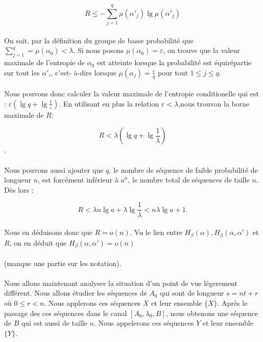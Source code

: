 	\[R \le -\sum_{j=1}^q\mu(\alpha'_j)\lg\mu(\alpha'_j)\]
	
	\paragraph{}
	On sait, par la définition du groupe de basse probabilité que $\sum_{j=1}^q =\mu(\alpha_0) < \lambda$. Si nous posons $\mu(\alpha_0)=\varepsilon$,
	on trouve que la valeur maximale de l'entropie de $\alpha_0$ est atteinte lorsque la probabilité est équirépartie sur tout les $\alpha'_i$, c'est-
	à-dire lorsque $\mu(\alpha_j)=\frac{\varepsilon}{q}$ pour tout $1\le j\le q$.
	
	\paragraph{}
	Nous pouvons donc calculer la valeur maximale de l'entropie conditionelle qui est : $\varepsilon \left(\lg q+\lg\frac{1}{\varepsilon}\right)$.
	En utilisant en plus la relation $\varepsilon < \lambda$,nous trouvon la borne maximale de $R$:
	
	\[R<\lambda\left(\lg q+\lg\frac{1}{\lambda}\right)\].
	
	\paragraph{}
	Nous pouvons aussi ajouter que $q$, le nombre de séquence de faible probabilité de longueur $n$, est forcément inférieur à $a^n$, le nombre total de séquences de taille $n$.
	Dès lors :
	
	\[R<\lambda n\lg a +\lambda \lg \frac{1}{\lambda}<n\lambda\lg a+1.\]
	
	\paragraph{}
	Nous en déduisons donc que $R=o(n)$. Vu le lien entre $H_\beta(\alpha),H_\beta(\alpha,\alpha')$ et $R$, on en déduit que $H_\beta(\alpha,\alpha')=o(n)$
	
	\paragraph{}
	(manque une partie sur les notation).
	
	\paragraph{}
	Nous allons maintenant analyser la situation d'un point de vue légerement différent. Nous allons étudier les séquences de $A_0$ qui sont de longueur $s = nt+r$
	où $0\le r < n$. Nous applerons ces séquences $X$ et leur ensemble $\{X\}$. Après le passage des ces séquences dans le canal $[A_0,\lambda_0,B]$, nous obtenons
	une séquence de $B$ qui est aussi de taille $n$. Nous appelerons ces séquences $Y$ et leur ensemble $\{Y\}$.
	
